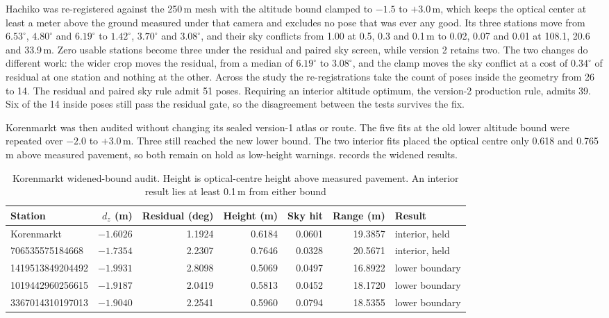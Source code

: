 \documentclass[journal]{IEEEtran}
\begin{document}
Hachiko was re-registered against the 250\,m mesh with the altitude bound
clamped to $-1.5$ to $+3.0$\,m, which keeps the optical center at least a meter
above the ground measured under that camera and excludes no pose that was ever
any good. Its three stations move from $6.53^\circ$, $4.80^\circ$ and
$6.19^\circ$ to $1.42^\circ$, $3.70^\circ$ and $3.08^\circ$, and their sky
conflicts from 1.00 at 0.5, 0.3 and 0.1\,m to 0.02, 0.07 and 0.01 at 108.1, 20.6
and 33.9\,m. Zero usable stations become three under the residual and paired
sky screen, while version 2 retains two. The two changes do different work:
the wider crop moves the residual, from a median of $6.19^\circ$ to
$3.08^\circ$, and the clamp moves the sky conflict at a cost of $0.34^\circ$ of
residual at one station and nothing at the other. Across the study the
re-registrations take the count of poses inside the geometry from 26 to 14. The
residual and paired sky rule admit 51 poses. Requiring an interior altitude
optimum, the version-2 production rule, admits 39. Six of the 14 inside poses
still pass the residual gate, so the disagreement between the tests survives
the fix.

Korenmarkt was then audited without changing its sealed version-1 atlas or
route. The five fits at the old lower altitude bound were repeated over
$-2.0$ to $+3.0$\,m. Three still reached the new lower bound. The two interior
fits placed the optical centre only 0.618 and 0.765\,m above measured pavement,
so both remain on hold as low-height warnings.
 records the widened results.

\begin{table}[!t]
  \caption{Korenmarkt widened-bound audit. Height is optical-centre height above
  measured pavement. An interior result lies at least 0.1\,m from either bound}
  \label{tab:si-korenmarkt-widened}
  \centering
  \begin{tabular}{lrrrrrl}
    \toprule
    Station & $d_z$ (m) & Residual (deg) & Height (m) & Sky hit & Range (m) & Result \\
    \midrule
    Korenmarkt & $-1.6026$ & 1.1924 & 0.6184 & 0.0601 & 19.3857 & interior, held \\
    706535575184668  & $-1.7354$ & 2.2307 & 0.7646 & 0.0328 & 20.5671 & interior, held \\
    1419513849204492 & $-1.9931$ & 2.8098 & 0.5069 & 0.0497 & 16.8922 & lower boundary \\
    1019442960256615 & $-1.9187$ & 2.0419 & 0.5813 & 0.0452 & 18.1720 & lower boundary \\
    3367014310197013 & $-1.9040$ & 2.2541 & 0.5960 & 0.0794 & 18.5355 & lower boundary \\
    \bottomrule
  \end{tabular}
\end{table}
\end{document}
